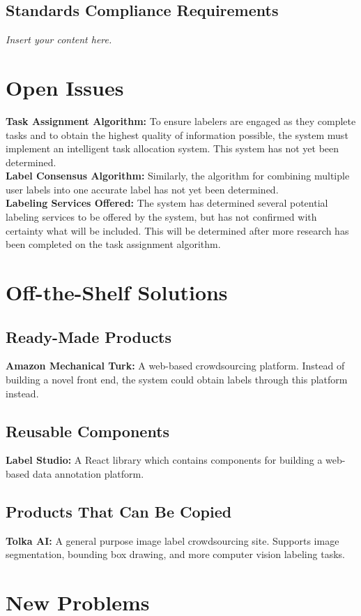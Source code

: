 \documentclass[12pt]{article}
\newcommand{\lips}{\textit{Insert your content here.}}
\begin{document}
\subsection{Standards Compliance Requirements}
\lips

\section{Open Issues}
\textbf{Task Assignment Algorithm: }To ensure labelers are engaged as they complete tasks and to obtain the highest quality of information possible, the system must implement an intelligent task allocation system. This system has not yet been determined.
\\\textbf{Label Consensus Algorithm: }Similarly, the algorithm for combining multiple user labels into one accurate label has not yet been determined. 
\\\textbf{Labeling Services Offered: }The system has determined several potential labeling services to be offered by the system, but has not confirmed with certainty what will be included. This will be determined after more research has been completed on the task assignment algorithm.

\section{Off-the-Shelf Solutions}
\subsection{Ready-Made Products}
\textbf{Amazon Mechanical Turk: } A web-based crowdsourcing platform. Instead of building a novel front end, the system could obtain labels through this platform instead.
\subsection{Reusable Components}
\textbf{Label Studio: } A React library which contains components for building a web-based data annotation platform.
\subsection{Products That Can Be Copied}
\textbf{Tolka AI: } A general purpose image label crowdsourcing site. Supports image segmentation, bounding box drawing, and more computer vision labeling tasks.

\section{New Problems}
\end{document}
